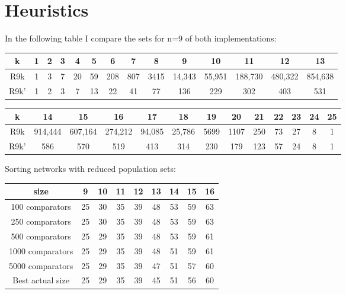 \documentclass[../main.tex]{subfiles}
\begin{document}
	\section{Heuristics}
	In the following table I compare the sets for n=9 of both implementations:
	\begin{center}
		\begin{tabular}{||c c c c c c c c c c c c c c||} 
			\hline
			k & 1 & 2 & 3 & 4 & 5 & 6 & 7 & 8 & 9 & 10 & 11 & 12 & 13  \\ [0.5ex] 
			\hline\hline
			R9k& 1 & 3 & 7 & 20 & 59 & 208 & 807 & 3415 & 14,343 & 55,951 & 188,730 & 480,322 & 854,638 \\ 
			\hline
			R9k' & 1 & 2 & 3 & 7 & 13 & 22 & 41 & 77 & 136 & 229 & 302 & 403 & 531 \\  [1ex] 
			\hline
		\end{tabular}
	\end{center}
	\begin{center}
		\begin{tabular}{|c c c c c c c c c c c c c|} 
			\hline
			k & 14 & 15 & 16 & 17 & 18 & 19 & 20 & 21 & 22 & 23 & 24 & 25  \\ [0.5ex] 
			\hline\hline
			R9k & 914,444 & 607,164 & 274,212 & 94,085 & 25,786 & 5699 & 1107 & 250 & 73 & 27 & 8 & 1 \\ 
			\hline
			R9k' & 586 & 570 & 519 & 413 & 314 & 230 & 179 & 123 & 57 & 24 & 8 & 1 \\  [1ex] 
			\hline
		\end{tabular}
	\end{center}
	
	Sorting networks with reduced population sets:
	\begin{center}
		\begin{tabular}{|c | c c c c c c c c|} 
			\hline
			size & 9 & 10 & 11 & 12 & 13 & 14 & 15 & 16  \\ [0.5ex] 
			\hline\hline
			100 comparators & 25 & 30 & 35 & 39 & 48 & 53 & 59 & 63 \\ [1ex]
			\hline
			250 comparators  & 25 & 30 & 35 & 39 & 48 & 53 & 59 & 63 \\  [1ex] 
			\hline
			500 comparators & 25 & 29 & 35 & 39 & 48 & 53 & 59 & 61 \\  [1ex] 
			\hline
			1000 comparators & 25 & 29 & 35 & 39 & 48 & 51 & 59 & 61 \\  [1ex] 
			\hline
			5000 comparators & 25 & 29 & 35 & 39 & 47 & 51 & 57 & 60 \\  [1ex] 
			\hline
			Best actual size & 25 & 29 & 35 & 39 & 45 & 51 & 56 & 60 \\  [1ex] 
			\hline
		\end{tabular}
	\end{center}
	

	\begin{sortingnetwork}{9}{15}{1}
	\end{sortingnetwork}
	
\end{document}
